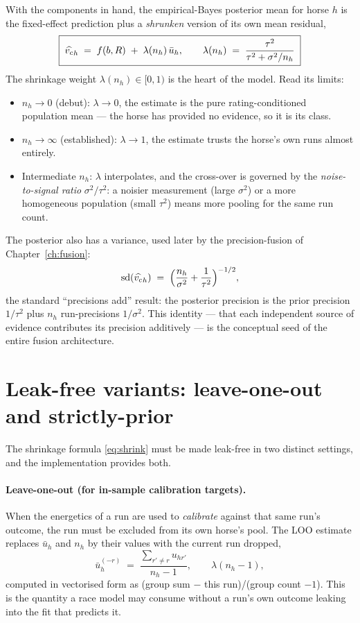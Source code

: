 With the components in hand, the empirical-Bayes posterior mean for horse $h$ is the
fixed-effect prediction plus a \emph{shrunken} version of its own mean residual,
\begin{equation}
  \boxed{\;\widehat{{v_{c}}}_h \;=\; f(b,R) \;+\; \lambda(n_h)\,\bar u_h,\qquad
  \lambda(n_h) \;=\; \frac{\tau^2}{\tau^2 + \sigma^2/n_h}\;}
  \label{eq:shrink}
\end{equation}
The shrinkage weight $\lambda(n_h)\in[0,1)$ is the heart of the model. Read its limits:
\begin{itemize}
  \item $n_h\to 0$ (debut): $\lambda\to 0$, the estimate is the pure rating-conditioned population
        mean --- the horse has provided no evidence, so it is its class.
  \item $n_h\to\infty$ (established): $\lambda\to 1$, the estimate trusts the horse's own runs
        almost entirely.
  \item Intermediate $n_h$: $\lambda$ interpolates, and the cross-over is governed by the
        \emph{noise-to-signal ratio} $\sigma^2/\tau^2$: a noisier measurement (large $\sigma^2$)
        or a more homogeneous population (small $\tau^2$) means more pooling for the same run
        count.
\end{itemize}
The posterior also has a variance, used later by the precision-fusion of Chapter~\ref{ch:fusion}:
\begin{equation}
  \mathrm{sd}(\widehat{{v_{c}}}_h)
   \;=\; \Bigl(\frac{n_h}{\sigma^2} + \frac{1}{\tau^2}\Bigr)^{-1/2},
  \label{eq:postsd}
\end{equation}
the standard ``precisions add'' result: the posterior precision is the prior precision $1/\tau^2$
plus $n_h$ run-precisions $1/\sigma^2$. This identity --- that each independent source of evidence
contributes its precision additively --- is the conceptual seed of the entire fusion architecture.

\section{Leak-free variants: leave-one-out and strictly-prior}

The shrinkage formula \eqref{eq:shrink} must be made leak-free in two distinct settings, and the
implementation provides both.

\paragraph{Leave-one-out (for in-sample calibration targets).} When the energetics of a run are
used to \emph{calibrate} against that same run's outcome, the run must be excluded from its own
horse's pool. The LOO estimate replaces $\bar u_h$ and $n_h$ by their values with the current run
dropped,
\begin{equation}
  \bar u_{h}^{(-r)} \;=\; \frac{\sum_{r'\ne r} u_{hr'}}{n_h-1},
  \qquad
  \lambda(n_h-1),
  \label{eq:loo}
\end{equation}
computed in vectorised form as (group sum $-$ this run)/(group count $-1$). This is the quantity a
race model may consume without a run's own outcome leaking into the fit that predicts it.

